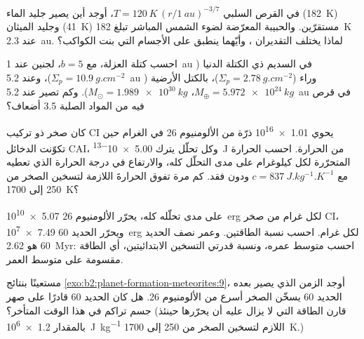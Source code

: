 \begin{exercise}[$\star\star$]\label{exo:b2:planet-formation-meteorites:6}
في القرص السلبي $T = \qty{120}{K}\,(r/\qty{1}{au})^{-3/7}$، أوجد أين يصير جليد
الماء (\qty{182}{K}) وجليد الميثان (\qty{41}{K}) مستقرّين. والحبيبة المعرّضة لضوء الشمس
المباشر تبلغ \qty{182}{K} عند \qty{2.3}{au}. لماذا يختلف التقديران ، وأيّهما ينطبق على الأجسام التي بنت الكواكب؟
\end{exercise}

\begin{exercise}[$\star\star$]\label{exo:b2:planet-formation-meteorites:7}
احسب كتلة العزلة، مع $b = 5$، لجنين عند \qty{1}{au} في
السديم ذي الكتلة الدنيا ($\Sigma_p = \qty{10.9}{g.cm^{-2}}$)، وعند \qty{5.2}{au}
وراء  ($\Sigma_p = \qty{2.78}{g.cm^{-2}}$)، بالكتل الأرضية
($M_\oplus = \qty{5.972e24}{kg}$، $M_\odot = \qty{1.989e30}{kg}$). وكم تصير
عند \qty{5.2}{au} في قرص فيه من المواد الصلبة \num{3.5} أضعاف؟
\end{exercise}

\begin{exercise}[$\star\star$]\label{exo:b2:planet-formation-meteorites:8}
كان صخر ذو تركيب CI يحوي \num{1.01e16} ذرّة من الألومنيوم 26 في الغرام حين
تكوّنت الدخائل CAI، وكل تحلّل يترك \qty{5.00e-13}{J} من الحرارة. احسب
الحرارة المتحرّرة لكل كيلوغرام على مدى التحلّل كله، والارتفاع في درجة الحرارة الذي
تعطيه مع $c = \qty{837}{J.kg^{-1}.K^{-1}}$ ودون فقد. كم مرة
تفوق الحرارةَ اللازمة لتسخين الصخر من \num{250} إلى
\qty{1700}{K}؟
\end{exercise}

\begin{exercise}[$\star\star$]\label{exo:b2:planet-formation-meteorites:9}
على مدى تحلّله كله، يحرّر الألومنيوم 26 \qty{5.07e10}{erg} لكل غرام من صخر CI،
ويحرّر الحديد 60 \qty{7.49e7}{erg} لكل غرام. احسب نسبة
الطاقتين. وعمر نصف الحديد 60 هو \qty{2.62}{Myr}: احسب متوسط عمره،
ونسبة قدرتي التسخين الابتدائيتين، أي الطاقة مقسومة على متوسط العمر.
\end{exercise}

\begin{exercise}[$\star\star\star$]\label{exo:b2:planet-formation-meteorites:10}
مستعينًا بنتائج \cref{exo:b2:planet-formation-meteorites:9}، أوجد الزمن الذي يصير بعده الحديد 60 يسخّن الصخر
أسرع من الألومنيوم 26. هل كان الحديد 60 قادرًا على صهر جسم تراكم في هذا الوقت
المتأخر؟ (قارن الطاقة التي لا يزال عليه أن يحرّرها حينئذ بالمقدار
\qty{1.2e6}{J.kg^{-1}} اللازم لتسخين الصخر من \num{250} إلى \qty{1700}{K}.)
\end{exercise}

